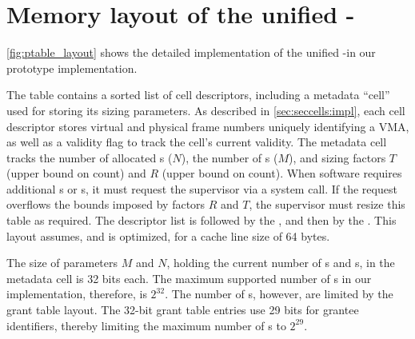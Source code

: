 
\section{Memory layout of the unified \ptable-\gtable}
\label{app:ptable}

\autoref{fig:ptable_layout} shows the detailed implementation of the
unified \ptable-\gtable in our prototype \seccells implementation.

The table contains a sorted list of cell descriptors, including a
metadata ``cell'' used for storing its sizing parameters.
As described in \autoref{sec:seccells:impl}, each cell descriptor stores virtual 
and physical frame numbers uniquely identifying a VMA, as well as a 
validity flag to track the cell's current validity.
The metadata cell tracks the number of allocated \cell{}s ($N$), the
number of \secdiv{}s ($M$), and sizing factors $T$ (upper bound on \cell count)
and $R$ (upper bound on \secdiv count).
When software requires additional \secdiv{}s or \cell{}s, it must request
the supervisor via a system call.
If the request overflows the bounds imposed by factors $R$ and $T$, the
supervisor must resize this table as required.
The \cell descriptor list is followed by the \ptable, and then by the
\gtable.
This layout assumes, and is optimized, for a cache line size of 64 bytes.

The size of parameters $M$ and $N$, holding the current number of \cell{}s
and \secdiv{}s, in the metadata cell is 32 bits each.
The maximum supported number of \cell{}s in our implementation, therefore,
is $2^{32}$.
The number of \secdiv{}s, however, are limited by the grant table layout.
The 32-bit grant table entries use 29 bits for grantee \secdiv{} identifiers,
thereby limiting the maximum number of \secdiv{}s to $2^{29}$.

